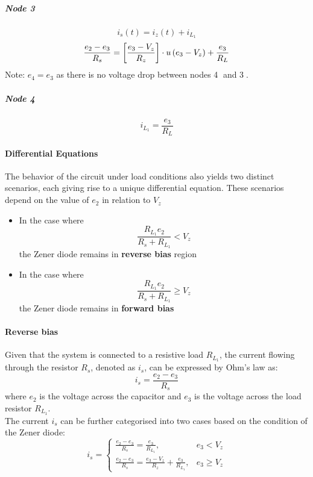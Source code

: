 \subparagraph{Node \textcircled{3}}
\begin{equation}
    i_s(t) = i_z(t) + i_{L_1}
\end{equation}
\begin{equation}
    \frac{e_2-e_3}{R_s}= \left[\frac{e_3 - V_z}{R_z} \right]\cdot u\left(e_3 - V_z \right) +\frac{e_3}{R_L}
\end{equation}
Note: $e_4 = e_3$ as there is no voltage drop between nodes \textcircled{4} and \textcircled{3}.

\subparagraph{Node \textcircled{4}}
\begin{equation}
	i_{L_1} = \frac{e_3}{R_L}
\end{equation}

\pagebreak
\paragraph{Differential Equations}
The behavior of the circuit under load conditions also yields two distinct scenarios, each giving rise to a unique differential equation. These scenarios depend on the value of \(e_2\) in relation to \(V_z\)

\begin{itemize}
	\item In the case where $$\frac{R_{L_1}e_2}{R_s+R_{L_1}} < V_z$$ the Zener diode remains in \textbf{reverse bias} region
	\item In the case where $$\frac{R_{L_1}e_2}{R_s+R_{L_1}} \geq V_z$$ the Zener diode remains in \textbf{forward bias}
\end{itemize}

\paragraph{Reverse bias}
Given that the system is connected to a resistive load $R_{L_1}$, the current flowing through the resistor $R_s$, denoted as $i_s$, can be expressed by Ohm's law as:
\begin{equation}
    i_s = \frac{e_2 - e_3}{R_s}
\end{equation}
where $e_2$ is the voltage across the capacitor and $e_3$ is the voltage across the load resistor $R_{L_1}$.
\\
The current $i_s$ can be further categorised into two cases based on the condition of the Zener diode:
\begin{equation}
    i_s=\begin{cases}
        \frac{e_2-e_3}{R_s}=\frac{e_3}{R_{L_1}},  & e_3<V_z\\
        \frac{e_2-e_3}{R_s}=\frac{e_3-V_z}{R_z}+\frac{e_3}{R_{L_1}},  & e_3 \geq V_z
    \end{cases}
    \label{eq:is_cases}
\end{equation}


